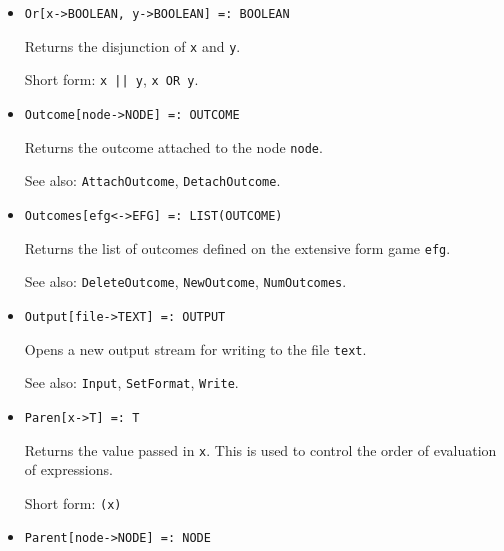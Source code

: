\begin{itemize}

\item 
\protect \large \begin{verbatim}
Or[x->BOOLEAN, y->BOOLEAN] =: BOOLEAN
\end{verbatim} \normalsize
  
\bd
Returns the disjunction of \verb+x+ and \verb+y+.
\item
[Short form:] \verb+x || y+, \verb+x OR y+.
\ed

\item
\protect \large \begin{verbatim}
Outcome[node->NODE] =: OUTCOME
\end{verbatim}\normalsize

\bd
Returns the outcome attached to the node \verb+node+.
\item
[See also:] {\tt AttachOutcome}, {\tt DetachOutcome}.
\ed

\item
\protect \large \begin{verbatim}
Outcomes[efg<->EFG] =: LIST(OUTCOME)
\end{verbatim}\normalsize

\bd
Returns the list of outcomes defined on the extensive form
game \verb+efg+.
\item
[See also:] {\tt DeleteOutcome}, {\tt NewOutcome}, {\tt NumOutcomes}.
\ed

\item
\protect \large \begin{verbatim}
Output[file->TEXT] =: OUTPUT
\end{verbatim}\normalsize

\bd
Opens a new output stream for writing to the file \verb+text+.
\item
[See also:]  {\tt Input}, {\tt SetFormat}, {\tt Write}.
\ed


\item
\protect \large \begin{verbatim}
Paren[x->T] =: T
\end{verbatim}\normalsize

\bd
Returns the value passed in \verb+x+.  This is used to control
the order of evaluation of expressions.
\item
[Short form:] \verb+(x)+
\ed

\item
\protect \large \begin{verbatim}
Parent[node->NODE] =: NODE
\end{verbatim}\normalsize


\end{itemize}
